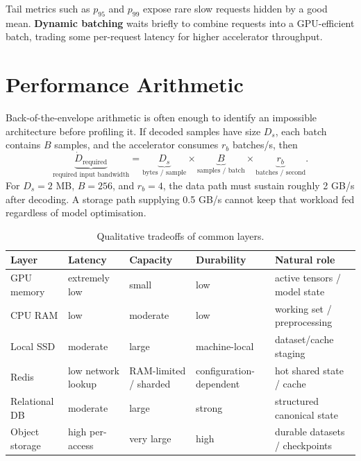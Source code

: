 Tail metrics such as \(p_{95}\) and \(p_{99}\) expose rare slow requests hidden by a good mean.
\textbf{Dynamic batching} waits briefly to combine requests into a GPU-efficient batch, trading some per-request latency for higher accelerator throughput.



\section{Performance Arithmetic}
\label{sec:performance-arithmetic}
\label{sec:system-design-optimisation}
\label{sec:data-system-optionality}

Back-of-the-envelope arithmetic is often enough to identify an impossible architecture before profiling it.
If decoded samples have size \(D_s\), each batch contains \(B\) samples, and the accelerator consumes \(r_b\) batches/s, then
\[
\underbrace{\dot D_{\text{required}}}_{\text{required input bandwidth}}
=
\underbrace{D_s}_{\text{bytes / sample}}
\times
\underbrace{B}_{\text{samples / batch}}
\times
\underbrace{r_b}_{\text{batches / second}}.
\]
For \(D_s=2\) MB, \(B=256\), and \(r_b=4\), the data path must sustain roughly 2 GB/s after decoding.
A storage path supplying 0.5 GB/s cannot keep that workload fed regardless of model optimisation.


\begin{table}[htbp]
\centering
\caption{Qualitative tradeoffs of common layers.}
\label{tab:storage-tradeoffs}
\begin{tabularx}{\linewidth}{@{}lXXXX@{}}
\toprule
\textbf{Layer} & \textbf{Latency} & \textbf{Capacity} & \textbf{Durability} & \textbf{Natural role} \\
\midrule
GPU memory & extremely low & small & low & active tensors / model state \\
CPU RAM & low & moderate & low & working set / preprocessing \\
Local SSD & moderate & large & machine-local & dataset/cache staging \\
Redis & low network lookup & RAM-limited / sharded & configuration-dependent & hot shared state / cache \\
Relational DB & moderate & large & strong & structured canonical state \\
Object storage & high per-access & very large & high & durable datasets / checkpoints \\
\bottomrule
\end{tabularx}
\end{table}

